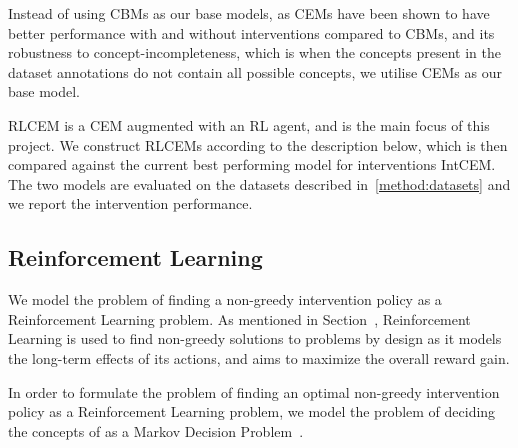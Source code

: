 \documentclass[../main.tex]{subfiles}
\begin{document}
Instead of using CBMs as our base models, as CEMs have been shown to have
better performance with and without interventions compared to CBMs, and its 
robustness to concept-incompleteness, which is when the concepts present 
in the dataset annotations do not contain all possible concepts, we utilise CEMs
as our base model.

RLCEM is a CEM augmented with an RL agent, and is the main focus of this project.
We construct RLCEMs according to the description below, which is then compared
against the current best performing model for interventions IntCEM. The two models 
are evaluated on the datasets described in~\ref{method:datasets} and we report
the intervention performance.

\subsection{Reinforcement Learning}\label{method:rl}


We model the problem of finding a non-greedy intervention policy as a 
Reinforcement Learning problem. As mentioned in Section~\cite{background:rl},
Reinforcement Learning is used to find non-greedy solutions to problems
by design as it models the long-term effects of its actions, and aims to 
maximize the overall reward gain. 

In order to formulate the problem of finding an optimal non-greedy intervention policy
as a Reinforcement Learning problem, we model the problem
of deciding the concepts of 
as a Markov Decision Problem~\cite{rl-mdp}.
\end{document}
